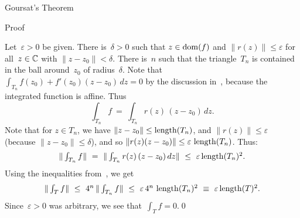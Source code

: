 \documentclass[a]{subfiles}
\begin{document}
\begin{parsec}
\begin{point}[goursat]{Goursat's Theorem}
\begin{point}[goursat-1]{Proof}
\begin{point}
Let~$\varepsilon >0$ be given.
There is~$\delta>0$
such that $z\in\operatorname{dom}(f)$
and $\|r(z)\|\leq \varepsilon$
for all~$z\in \mathbb{C}$ with $\|z-z_0\|<\delta$.
There is~$n$ such that the triangle~$T_n$ is contained
in the ball around~$z_0$ of radius~$\delta$.
Note that $\int_{T_n} f(z_0)+f'(z_0)(z-z_0)\,dz=0$
by the discussion in~, because
the integrated function is affine.
Thus
\begin{equation*}
\textstyle
\int_{T_n} f \  = \ \int_{T_n}r(z)\,(z-z_0)\,dz.
\end{equation*}
Note that for $z\in T_n$,
we have  $\|z-z_0\|\leq \operatorname{length}(T_n)$,
and $\|r(z)\|\leq \varepsilon$ (because $\|z-z_0\|\leq \delta$),
and so $\|r(z)(z-z_0)\|\leq \varepsilon\,\operatorname{length}(T_n)$.
Thus:
\begin{equation*}
\textstyle
\|\int_{T_n} f\| \  = \ \|\int_{T_n}r(z)\,(z-z_0)\,dz\|
\ \leq\ \varepsilon\operatorname{length}(T_n)^2.
\end{equation*}
Using the inequalities from~,
we get
\begin{equation*}
\textstyle
\|\int_T f\|\ \leq\ 4^n\, \|\int_{T_n} f\|
\ \leq\ \varepsilon \,4^n\,\operatorname{length}(T_n)^2 
\ \equiv\ \varepsilon \operatorname{length}(T)^2.
\end{equation*}
Since~$\varepsilon>0$ was arbitrary,
we see that~$\int_T f=0$.\qed
\end{point}
\end{point}



\end{point}
\end{parsec}
\end{document}
